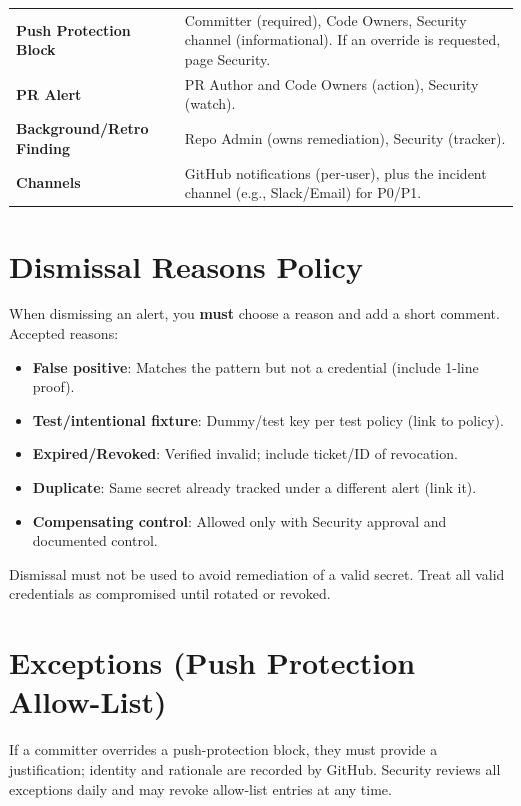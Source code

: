 \documentclass[11pt,a4paper]{article}
\begin{document}
\begin{tabularx}{\linewidth}{>{\bfseries}l X}
\toprule
Push Protection Block & Committer (required), Code Owners, Security channel (informational). If an override is requested, page Security. \\
PR Alert & PR Author and Code Owners (action), Security (watch). \\
Background/Retro Finding & Repo Admin (owns remediation), Security (tracker). \\
Channels & GitHub notifications (per-user), plus the incident channel (e.g., Slack/Email) for P0/P1. \\
\bottomrule
\end{tabularx}

\section{Dismissal Reasons Policy}\label{sec:dismissal}
When dismissing an alert, you \textbf{must} choose a reason and add a short comment. Accepted reasons:
\begin{itemize}[leftmargin=1.2em]
  \item \textbf{False positive}: Matches the pattern but not a credential (include 1-line proof).
  \item \textbf{Test/intentional fixture}: Dummy/test key per test policy (link to policy).
  \item \textbf{Expired/Revoked}: Verified invalid; include ticket/ID of revocation.
  \item \textbf{Duplicate}: Same secret already tracked under a different alert (link it).
  \item \textbf{Compensating control}: Allowed only with Security approval and documented control.
\end{itemize}

\begin{criticalbox}
Dismissal must not be used to avoid remediation of a valid secret. Treat all valid credentials as compromised until rotated or revoked.
\end{criticalbox}

\section{Exceptions (Push Protection Allow-List)}
If a committer overrides a push-protection block, they must provide a justification; identity and rationale are recorded by GitHub. Security reviews all exceptions daily and may revoke allow-list entries at any time.
\end{document}
